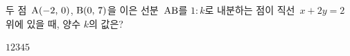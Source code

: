 두 점~$\mathrm{A}(-2,\,0)$, $\mathrm{B}(0,\,7)$을 이은 선분~$\mathrm{AB}$를 $1:k$로 내분하는 점이 직선~$x+2y=2$ 위에 있을 때, 양수 $k$의 값은?
\begin{choices32}{$1$}{$2$}{$3$}{$4$}{$5$}\end{choices32}
